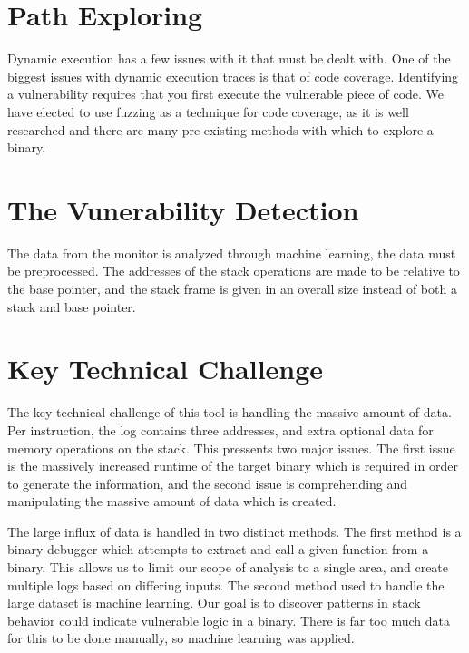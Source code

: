 \documentclass{article}
\begin{document}
\section {Path Exploring} Dynamic execution has a few issues with it that must
be dealt with. One of the biggest issues with dynamic execution traces is that
of code coverage. Identifying a vulnerability requires that you first execute
the vulnerable piece of code. We have elected to use fuzzing as a technique for
code coverage, as it is well researched and there are many pre-existing methods
with which to explore a binary.

\section {The Vunerability Detection} The data from the monitor is analyzed
through machine learning, the data must be preprocessed. The addresses of the
stack operations are made to be relative to the base pointer, and the stack
frame is given in an overall size instead of both a stack and base pointer.

\section{Key Technical Challenge}

The key technical challenge of this tool is handling the massive amount of
data. Per instruction, the log contains three addresses, and extra optional
data for memory operations on the stack. This pressents two major issues. The
first issue is the massively increased runtime of the target binary which is
required in order to generate the information, and the second issue is
comprehending and manipulating the massive amount of data which is created.

The large influx of data is handled in two distinct methods. The first method
is a binary debugger which attempts to extract and call a given function from a
binary. This allows us to limit our scope of analysis to a single area, and
create multiple logs based on differing inputs. The second method used to
handle the large dataset is machine learning. Our goal is to discover patterns
in stack behavior could indicate vulnerable logic in a binary. There is far too
much data for this to be done manually, so machine learning was applied.
\end{document}
